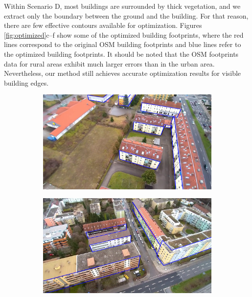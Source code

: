 Within Scenario D, most buildings are surrounded by thick vegetation, and we extract only the boundary between the ground and the building. For that reason, there are few effective contours available for optimization. Figures \ref{fig:optimized}c--f show some of the optimized building footprints, where the red lines correspond to the original OSM building footprints and blue lines refer to the optimized building footprints. It should be noted that the OSM footprints data for rural areas exhibit much larger errors than in the urban area. Nevertheless, our method still achieves accurate optimization results for visible building edges.



\begin{figure}[H]
    \centering
       \begin{subfigure}[tbp]{0.48\columnwidth}
           \centering
           \includegraphics[width=\textwidth]{optimize/mil_alloptim_1.png}
           \caption[]{}
           {{\small }}
           \label{fig:7a}
       \end{subfigure}
       \hfill
       \begin{subfigure}[tbp]{0.48\columnwidth}
           \centering
           \includegraphics[width=\textwidth]{optimize/mil_alloptim_2.png}

\end{subfigure}
\end{figure}
